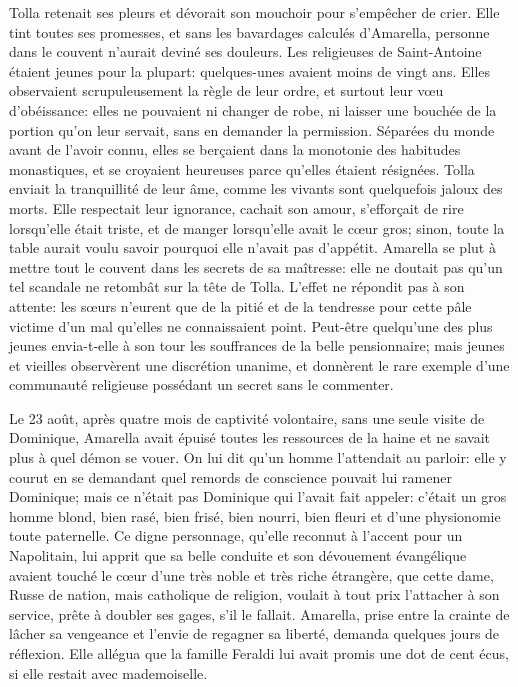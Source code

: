 Tolla retenait ses pleurs et dévorait son mouchoir pour s'empêcher de crier. Elle tint toutes ses promesses, et sans les bavardages calculés d'Amarella, personne dans le couvent n'aurait deviné ses douleurs. Les religieuses de Saint-Antoine étaient jeunes pour la plupart: quelques-unes avaient moins de vingt ans. Elles observaient scrupuleusement la règle de leur ordre, et surtout leur v\oe{}u d'obéissance: elles ne pouvaient ni changer de robe, ni laisser une bouchée de la portion qu'on leur servait, sans en demander la permission. Séparées du monde avant de l'avoir connu, elles se berçaient dans la monotonie des habitudes monastiques, et se croyaient heureuses parce qu'elles étaient résignées. Tolla enviait la tranquillité de leur âme, comme les vivants sont quelquefois jaloux des morts. Elle respectait leur ignorance, cachait son amour, s'efforçait de rire lorsqu'elle était triste, et de manger lorsqu'elle avait le c\oe{}ur gros; sinon, toute la table aurait voulu savoir pourquoi elle n'avait pas d'appétit. Amarella se plut à mettre tout le couvent dans les secrets de sa maîtresse: elle ne doutait pas qu'un tel scandale ne retombât sur la tête de Tolla. L'effet ne répondit pas à son attente: les s\oe{}urs n'eurent que de la pitié et de la tendresse pour cette pâle victime d'un mal qu'elles ne connaissaient point. Peut-être quelqu'une des plus jeunes envia-t-elle à son tour les souffrances de la belle pensionnaire; mais jeunes et vieilles observèrent une discrétion unanime, et donnèrent le rare exemple d'une communauté religieuse possédant un secret sans le commenter.

Le 23 août, après quatre mois de captivité volontaire, sans une seule visite de Dominique, Amarella avait épuisé toutes les ressources de la haine et ne savait plus à quel démon se vouer. On lui dit qu'un homme l'attendait au parloir: elle y courut en se demandant quel remords de conscience pouvait lui ramener Dominique; mais ce n'était pas Dominique qui l'avait fait appeler: c'était un gros homme blond, bien rasé, bien frisé, bien nourri, bien fleuri et d'une physionomie toute paternelle. Ce digne personnage, qu'elle reconnut à l'accent pour un Napolitain, lui apprit que sa belle conduite et son dévouement évangélique avaient touché le c\oe{}ur d'une très noble et très riche étrangère, que cette dame, Russe de nation, mais catholique de religion, voulait à tout prix l'attacher à son service, prête à doubler ses gages, s'il le fallait. Amarella, prise entre la crainte de lâcher sa vengeance et l'envie de regagner sa liberté, demanda quelques jours de réflexion. Elle allégua que la famille Feraldi lui avait promis une dot de cent écus, si elle restait avec mademoiselle.

